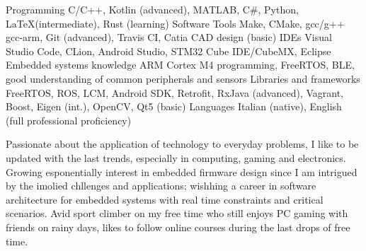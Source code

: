 \vspace*{-16pt}
\begin{cventries}
    
    \begin{cvskills}
        \cvskill
        {Programming}
        {C/C++, Kotlin (advanced), MATLAB, C\#, Python, \LaTeX (intermediate), Rust (learning)}
        \cvskill
        {Software Tools}
        {Make, CMake, gcc/g++ gcc-arm, Git (advanced), Travis CI, Catia CAD design (basic)}
        \cvskill
        {IDEs}
        {Visual Studio Code, CLion, Android Studio, STM32 Cube IDE/CubeMX, Eclipse}
        \cvskill
        {Embedded systems knowledge}
        {ARM Cortex M4 programming, FreeRTOS, BLE, good understanding \linebreak of common peripherals and sensors}
        \cvskill
        {Libraries and frameworks}
        {FreeRTOS, ROS, LCM, Android SDK, Retrofit, RxJava (advanced), Vagrant, Boost, Eigen (int.), \linebreak OpenCV, Qt5 (basic)}
        \cvskill
        {Languages}
        {Italian (native), English (full professional proficiency)}
    \end{cvskills}

\end{cventries}

\begin{cvparagraph}
   Passionate about the application of technology to everyday problems, I like to be updated with the last trends, especially in computing, gaming and electronics. 
   Growing esponentially interest in embedded firmware design since I am intrigued by the imolied chllenges and applications; wishhing a career in software architecture for embedded systems with real time constraints and critical scenarios.
   Avid sport climber on my free time who still enjoys PC gaming with friends on rainy days, likes to follow online courses during the last drops of free time.
\end{cvparagraph}